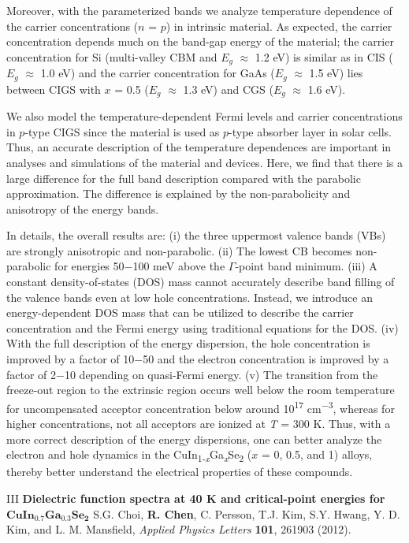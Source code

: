 \documentclass[a4paper, 12pt, titlepage,oneside,drop]{kthesis}
\begin{document}
Moreover, with the parameterized bands we analyze temperature dependence of the carrier concentrations ($n$ = $p$) in intrinsic material. As expected, the carrier concentration depends much on the band-gap energy of the material; 
the carrier concentration for Si (multi-valley CBM and $E_g$ $\approx$ 1.2 eV) is similar as in CIS ($E_g$ $\approx$ 1.0 eV) and the carrier concentration for GaAs ($E_g$ $\approx$ 1.5 eV) lies between CIGS with
$x$ = 0.5 ($E_g$ $\approx$ 1.3 eV) and CGS ($E_g$ $\approx$ 1.6 eV).       

We also model the temperature-dependent Fermi levels and carrier concentrations in $p$-type CIGS 
since the material is used as $p$-type absorber layer in solar cells. Thus, an accurate description of the temperature dependences are important in analyses and simulations of the material and devices. Here, we find that there 
is a large difference for the full band description compared with the parabolic approximation. The difference is explained by the non-parabolicity and anisotropy of the energy bands.  

\noindent In details, the overall results are: 
(i) the three uppermost valence bands (VBs) are strongly anisotropic and non-parabolic. (ii) The lowest CB becomes non-parabolic for energies 50$-$100 meV above the $\Gamma$-point band minimum. (iii) A constant
density-of-states (DOS) mass cannot accurately describe band filling of the valence bands even at low hole concentrations. Instead, we introduce an energy-dependent DOS mass that can be utilized to describe the carrier concentration 
and the Fermi energy using traditional equations for the DOS. (iv) With the full description of the energy dispersion, the hole concentration is improved by a factor of 10$-$50 and the electron concentration is improved by a factor
of 2$-$10 depending on quasi-Fermi energy. (v) The transition from the freeze-out region to the extrinsic region occurs well below the room temperature for uncompensated acceptor concentration below 
around 10\textsuperscript{17} cm\textsuperscript{$-$3}, whereas for higher concentrations, not all acceptors are ionized at \textit{T} = 300 K. Thus, with a more correct description of the energy dispersions, one can better analyze the
electron and hole dynamics in the CuIn\textsubscript{1-\textit{x}}Ga\textsubscript{\textit{x}}Se\textsubscript{2} ($x$ = 0, 0.5, and 1) alloys, thereby better understand the electrical properties of these compounds. 

III \textbf{Dielectric function spectra at 40 K and critical-point energies for $\mathbf {CuIn_{0.7}Ga_{0.3}Se_2}$}
S.G. Choi, \textbf{R. Chen}, C. Persson, T.J. Kim, S.Y. Hwang, Y. D. Kim, and L. M. Mansfield,
\textit{Applied Physics Letters} {\textbf {101}}, 261903 (2012).
\end{document}
